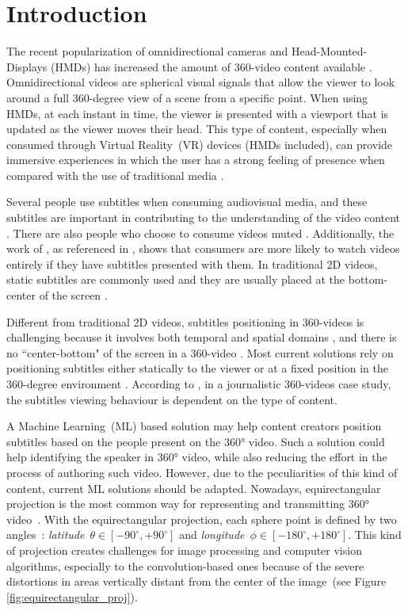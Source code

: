 \section{Introduction}

The recent popularization of omnidirectional cameras and Head-Mounted-Displays (HMDs) has increased the amount of 360-video content available \cite{mendes_2020}. Omnidirectional videos are spherical visual signals that allow the viewer to look around a full 360-degree view of a scene from a specific point. When using HMDs, at each instant in time, the viewer is presented with a viewport that is updated as the viewer moves their head. This type of content, especially when consumed through Virtual Reality~(VR) devices (HMDs included), can provide immersive experiences in which the user has a strong feeling of presence when compared with the use of traditional media \cite{montagud_culture_2020}.

Several people use subtitles when consuming audiovisual media, and these subtitles are important in contributing to the understanding of the video content \cite{brown_subtitles_2017}. There are also people who choose to consume videos muted \cite{hughes_disruptive_2019}. Additionally, the work of \cite{hayati2011effect}, as referenced in \cite{hughes_disruptive_2019}, shows that consumers are more likely to watch videos entirely if they have subtitles presented with them. In traditional 2D videos, static subtitles are commonly used and they are usually placed at the bottom-center of the screen \cite{rothe_dynamic_2018}.

Different from traditional 2D videos, subtitles positioning in 360-videos is challenging because it involves both temporal and spatial domains \cite{agullo2019making}, and there is no ``center-bottom" of the screen in a 360-video \cite{brown_subtitles_2017}. Most current solutions rely on positioning subtitles either statically to the viewer or at a fixed position in the 360-degree environment \cite{mendes_2020}. According to \cite{li_impacts_2018}, in a journalistic 360-videos case study, the subtitles viewing behaviour is dependent on the type of content. 

A Machine Learning~(ML) based solution may help content creators position subtitles based on the people present on the 360° video. Such a solution could help identifying the speaker in 360° video, while also reducing the effort in the process of authoring such video. However, due to the peculiarities of this kind of content, current ML solutions should be adapted. Nowadays, equirectangular projection is the most common way for representing and transmitting 360° video~\cite{yang2018object}. With the equirectangular projection, each sphere point is defined by two angles~\cite{snyder1987map}: \emph{latitude}~$\theta \in [-90^{\circ}, +90^{\circ}]$ and \emph{longitude}~$\phi \in [-180^{\circ}, +180^{\circ}]$. This kind of projection creates challenges for image processing and computer vision algorithms, especially to the convolution-based ones because of the severe distortions in areas vertically distant from the center of the image~(see Figure \ref{fig:equirectangular_proj}). 

